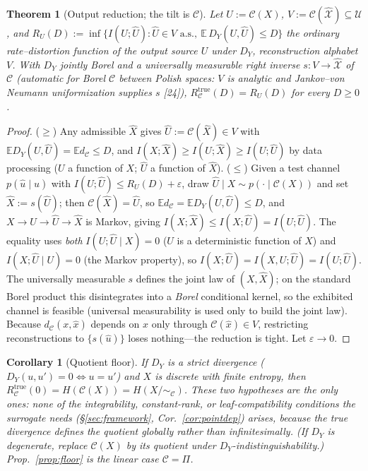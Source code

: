 \documentclass[lettersize,onecolumn]{IEEEtran}
\newtheorem{theorem}{Theorem}
\newtheorem{corollary}{Corollary}
\theoremstyle{definition}
\theoremstyle{remark}
\newcommand{\E}{\mathbb{E}}
\begin{document}
\begin{theorem}[Output reduction; the tilt is $\mathcal{C}$]\label{thm:B2}
Let $U:=\mathcal{C}(X)$, $V:=\mathcal{C}(\hat{\mathcal{X}})\subseteq\mathcal{U}$, and
$R_U(D):=\inf\{I(U;\hat U):\hat U\in V\text{ a.s.},\ \E\,D_Y(U,\hat U)\le D\}$ the
ordinary rate--distortion function of the output source $U$ under $D_Y$, reconstruction
alphabet $V$. With $D_Y$ jointly Borel and a universally measurable right inverse
$s:V\to\hat{\mathcal{X}}$ of $\mathcal{C}$ (automatic for Borel $\mathcal{C}$ between
Polish spaces: $V$ is analytic and Jankov--von Neumann uniformization supplies $s$
[24]), $R_{\mathcal{C}}^{\mathrm{true}}(D)=R_U(D)$ for every $D\ge0$.
\end{theorem}
\begin{proof}
($\ge$) Any admissible $\hat X$ gives $\hat U:=\mathcal{C}(\hat X)\in V$ with
$\E D_Y(U,\hat U)=\E d_{\mathcal{C}}\le D$, and $I(X;\hat X)\ge I(U;\hat X)\ge
I(U;\hat U)$ by data processing ($U$ a function of $X$; $\hat U$ a function of
$\hat X$). ($\le$) Given a test channel $p(\hat u\mid u)$ with $I(U;\hat U)\le
R_U(D)+\varepsilon$, draw $\hat U\mid X\sim p(\cdot\mid\mathcal{C}(X))$ and set
$\hat X:=s(\hat U)$; then $\mathcal{C}(\hat X)=\hat U$, so $\E d_{\mathcal{C}}=\E
D_Y(U,\hat U)\le D$, and $X\to U\to\hat U\to\hat X$ is Markov, giving $I(X;\hat X)\le
I(X;\hat U)=I(U;\hat U)$. The equality uses \emph{both} $I(U;\hat U\mid X)=0$ ($U$ is
a deterministic function of $X$) and $I(X;\hat U\mid U)=0$ (the Markov property), so
$I(X;\hat U)=I(X,U;\hat U)=I(U;\hat U)$. The universally measurable $s$ defines the
joint law of $(X,\hat X)$; on the standard Borel product this disintegrates into a
\emph{Borel} conditional kernel, so the exhibited channel is feasible (universal
measurability is used only to build the joint law). Because $d_{\mathcal{C}}(x,\hat x)$
depends on $\hat x$ only through $\mathcal{C}(\hat x)\in V$, restricting reconstructions
to $\{s(\hat u)\}$ loses nothing---the reduction is tight. Let $\varepsilon\to0$.
\end{proof}

\begin{corollary}[Quotient floor]\label{cor:B2a}
If $D_Y$ is a \emph{strict} divergence ($D_Y(u,u')=0\iff u=u'$) and $X$ is discrete
with finite entropy, then $R_{\mathcal{C}}^{\mathrm{true}}(0)=H(\mathcal{C}(X))=
H(X/\!\sim_{\mathcal{C}})$. These two hypotheses are the only ones: \emph{none} of the
integrability, constant-rank, or leaf-compatibility conditions the \emph{surrogate}
needs (\S\ref{sec:framework}, Cor.~\ref{cor:pointdep}) arises, because the true
divergence defines the quotient globally rather than infinitesimally. (If $D_Y$ is
degenerate, replace $\mathcal{C}(X)$ by its quotient under $D_Y$-indistinguishability.)
Prop.~\ref{prop:floor} is the linear case $\mathcal{C}=\Pi$.
\end{corollary}
\end{document}
